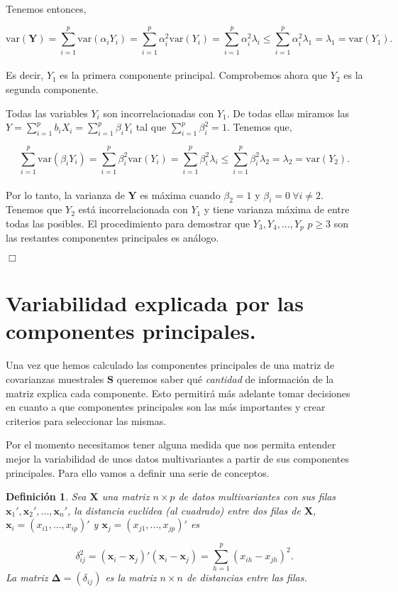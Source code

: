 \documentclass[tfg,cienciasbased,lot,lof,covers,final,overleaf,nocopyright]{tfgtfmthesisuam}
\newtheorem{defi}{Definición}[chapter]
\begin{document}
Tenemos entonces,

\begin{equation*}
    \mbox{var}(\mathbf{Y}) = \sum_{i=1}^{p} \mbox{var}(\alpha_i Y_i) = \sum_{i=1}^{p} \alpha_i^2 \mbox{var}(Y_i) = \sum_{i=1}^{p} \alpha_i^2 \lambda_i \leq \sum_{i=1}^{p} \alpha_i^2 \lambda_1 = \lambda_1 = \mbox{var}(Y_1).
\end{equation*}\\
Es decir, $Y_1$ es la primera componente principal. Comprobemos ahora que $Y_2$ es la segunda componente.

Todas las variables $Y_i$ son incorrelacionadas con $Y_1$. De todas ellas miramos las $Y = \sum_{i=1}^{p} b_i X_i = \sum_{i=1}^{p} \beta_i Y_i$ tal que $\sum_{i=1}^{p} \beta_i^2 = 1$. Tenemos que, 

\begin{equation*}
    \sum_{i=1}^{p} \mbox{var}(\beta_i Y_i) = \sum_{i=1}^{p} \beta_i^2 \mbox{var}(Y_i) = \sum_{i=1}^{p} \beta_i^2 \lambda_i \leq \sum_{i=1}^{p} \beta_i^2 \lambda_2 = \lambda_2 = \mbox{var}(Y_2).
\end{equation*}\\
Por lo tanto, la varianza de $\mathbf{Y}$ es máxima cuando $\beta_2 = 1$ y $\beta_i = 0\  \forall i \neq 2$. Tenemos que $Y_2$ está incorrelacionada con $Y_1$ y tiene varianza máxima de entre todas las posibles. El procedimiento para demostrar que $Y_3, Y_4, ..., Y_p$ $p \geq 3$ son las restantes componentes principales es análogo.
\begin{flushright}$\Box$\end{flushright}

\section{Variabilidad explicada por las componentes principales.}

Una vez que hemos calculado las componentes principales de una matriz de covarianzas muestrales $\mathbf{S}$ queremos saber qué \textit{cantidad} de información de la matriz explica cada componente. Esto permitirá más adelante tomar decisiones en cuanto a que componentes principales son las más importantes y crear criterios para seleccionar las mismas.

Por el momento necesitamos tener alguna medida que nos permita entender mejor la variabilidad de unos datos multivariantes a partir de sus componentes principales. Para ello vamos a definir una serie de conceptos.

\begin{defi}
    Sea $\mathbf{X}$ una matriz $n \times p$ de datos multivariantes con sus filas $\mathbf{x}_1', \mathbf{x}_2', ..., \mathbf{x}_n'$, la distancia euclídea (al cuadrado) entre dos filas de $\mathbf{X}$, $\mathbf{x}_i = (x_{i1}, ..., x_{ip})'$ y $\mathbf{x}_j = (x_{j1}, ..., x_{jp})'$
    es
    
    $$\delta_{ij}^2 = (\mathbf{x}_i - \mathbf{x}_j)'(\mathbf{x}_i - \mathbf{x}_j) = \sum_{h=1}^{p}(x_{ih} - x_{jh})^2.$$
    La matriz $\mathbf{\Delta} = (\delta_{ij})$ es la matriz $n \times n$ de distancias entre las filas.
\end{defi}
\end{document}
